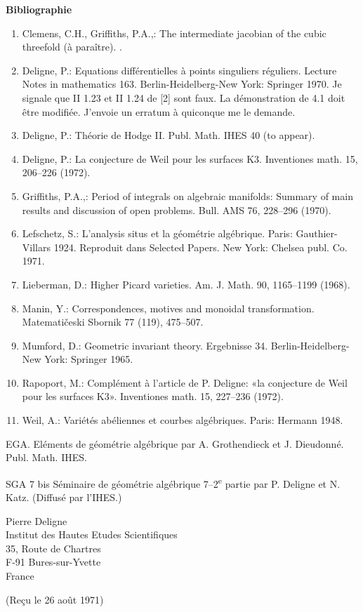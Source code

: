 \documentclass[10pt]{article}
\newcommand{\sourcebreak}{\clearpage}
\begin{document}
\begin{center}\bfseries Bibliographie\end{center}
\begin{enumerate}[label=\arabic*.]
\item Clemens, C.H., Griffiths, P.A.,: The intermediate jacobian of the cubic threefold (à paraître). .
\item Deligne, P.: Equations différentielles à points singuliers réguliers. Lecture Notes in mathematics 163. Berlin-Heidelberg-New York: Springer 1970. Je signale que II 1.23 et II 1.24 de [2] sont faux. La démonstration de 4.1 doit être modifiée. J'envoie un erratum à quiconque me le demande.
\item Deligne, P.: Théorie de Hodge II. Publ. Math. IHES 40 (to appear).
\item Deligne, P.: La conjecture de Weil pour les surfaces K3. Inventiones math. 15, 206--226 (1972).
\item Griffiths, P.A.,: Period of integrals on algebraic manifolds: Summary of main results and discussion of open problems. Bull. AMS 76, 228--296 (1970).
\item Lefschetz, S.: L'analysis situs et la géométrie algébrique. Paris: Gauthier-Villars 1924. Reproduit dans Selected Papers. New York: Chelsea publ. Co. 1971.
\item Lieberman, D.: Higher Picard varieties. Am. J. Math. 90, 1165--1199 (1968).
\item Manin, Y.: Correspondences, motives and monoidal transformation. Matematičeski Sbornik 77 (119), 475--507.
\end{enumerate}

\sourcebreak
\begin{enumerate}[label=\arabic*.]
\setcounter{enumi}{8}
\item Mumford, D.: Geometric invariant theory. Ergebnisse 34. Berlin-Heidelberg-New York: Springer 1965.
\item Rapoport, M.: Complément à l'article de P. Deligne: «la conjecture de Weil pour les surfaces K3». Inventiones math. 15, 227--236 (1972).
\item Weil, A.: Variétés abéliennes et courbes algébriques. Paris: Hermann 1948.
\end{enumerate}

\noindent EGA. Eléments de géométrie algébrique par A. Grothendieck et J. Dieudonné. Publ. Math. IHES.

\noindent SGA 7 bis Séminaire de géométrie algébrique 7--2\textsuperscript{e} partie par P. Deligne et N. Katz. (Diffusé par l'IHES.)

\begin{flushright}
Pierre Deligne\\
Institut des Hautes Etudes Scientifiques\\
35, Route de Chartres\\
F-91 Bures-sur-Yvette\\
France
\end{flushright}

\begin{center}
(Reçu le 26 août 1971)
\end{center}

\end{document}

